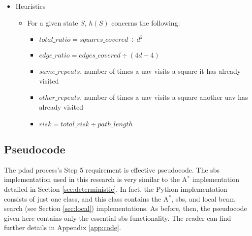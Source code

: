 \documentclass[../main.tex]{subfiles}
\begin{document}
\begin{itemize}
    \item Heuristics
    \begin{itemize}
        \item For a given state $S$, $h(S)$ concerns the following:
        \begin{itemize}
            \item $total\_ratio=squares\_covered\div d^2$
            \item $edge\_ratio=edges\_covered\div (4d-4)$
            \item $same\_repeats$, number of times a \ac{uav} visits a square it has already visited
            \item $other\_repeats$, number of times a \ac{uav} visits a square another \ac{uav} has already visited
            \item $risk=total\_risk\div path\_length$
        \end{itemize}
    \end{itemize}
\end{itemize}

\subsection{Pseudocode}\label{sto:pseudocode}

The \ac{pdad} process's Step 5 requirement is effective pseudocode. The \ac{sbs} implementation used in this research is very similar to the A$^*$ implementation detailed in Section \ref{sec:deterministic}. In fact, the Python implementation consists of just one class, and this class contains the A$^*$, \ac{sbs}, and local beam search (see Section \ref{sec:local}) implementations. As before, then, the pseudocode given here contains only the essential \ac{sbs} functionality. The reader can find further details in Appendix \ref{app:code}. 
\end{document}
